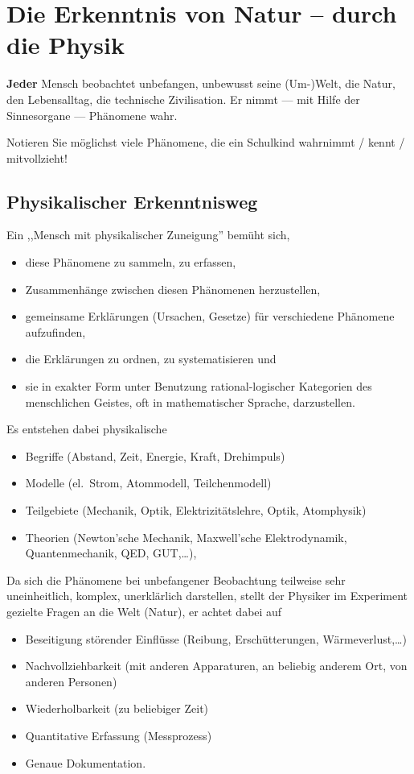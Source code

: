 \chapter{Die Erkenntnis von Natur -- durch die Physik}\label{Erkenntnis}

{\bf Jeder} Mensch beobachtet unbefangen, unbewusst seine (Um-)Welt, die Natur, den Lebensalltag,
die technische Zivilisation. Er nimmt --- mit Hilfe der Sinnesorgane --- Ph\"{a}nomene wahr.

\begin{uea}
	Notieren Sie m\"{o}glichst viele Ph\"{a}nomene, die ein Schulkind wahrnimmt / kennt / mitvollzieht!
\end{uea}


\section{Physikalischer Erkenntnisweg}

Ein ,,Mensch mit physikalischer Zuneigung'' bem\"{u}ht sich,
\begin{itemize}
	\item diese Ph\"{a}nomene zu sammeln, zu erfassen,
	\item Zusammenh\"{a}nge zwischen diesen Ph\"{a}nomenen herzustellen,
	\item gemeinsame Erkl\"{a}rungen (Ursachen, Gesetze) f\"{u}r verschiedene Ph\"{a}nomene aufzufinden,
	\item die Erkl\"{a}rungen zu ordnen, zu systematisieren \quad und
	\item sie in exakter Form unter Benutzung rational-logischer Kategorien des menschlichen Geistes, oft in mathematischer Sprache, darzustellen.
\end{itemize}

Es entstehen dabei physikalische
\begin{itemize}
	\item Begriffe (Abstand, Zeit, Energie, Kraft, Drehimpuls)
	\item Modelle (el.\ Strom, Atommodell, Teilchenmodell)
	\item Teilgebiete (Mechanik, Optik, Elektrizit\"{a}tslehre, Optik, Atomphysik)
	\item Theorien (Newton'sche Mechanik, Maxwell'sche Elektrodynamik, Quantenmechanik, QED, GUT,\dots),
\end{itemize}

\mip
Da sich die Ph\"{a}nomene bei unbefangener Beobachtung teilweise sehr uneinheitlich, komplex,
unerkl\"{a}rlich darstellen, stellt der Physiker im Experiment gezielte Fragen an die Welt (Natur),
er achtet dabei auf
\begin{itemize}
	\item Beseitigung st\"{o}render Einfl\"{u}sse (Reibung, Ersch\"{u}tterungen, W\"{a}rmeverlust,\dots )
	\item Nachvollziehbarkeit (mit anderen Apparaturen, an beliebig anderem Ort, von anderen Personen)
	\item Wiederholbarkeit (zu beliebiger Zeit)
	\item Quantitative Erfassung (Messprozess)
	\item Genaue Dokumentation.
\end{itemize}

